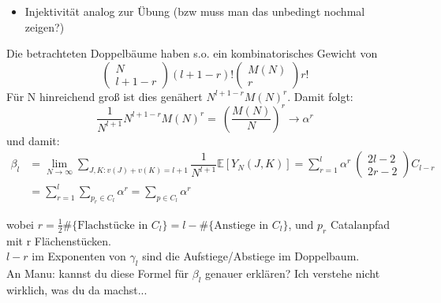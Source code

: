 \documentclass[a4paper, 11pt]{scrreprt}
\newenvironment{beweis}[1][Beweis]{\begin{trivlist}
	\item[\hskip \labelsep {\bfseries #1}]}
	{\end{trivlist}}
\newcommand{\EE}{\mathbb{E}}
\begin{document}
\begin{beweis}
\begin{itemize}
\item[•] Injektivität analog zur Übung (bzw muss man das unbedingt nochmal zeigen?)\\
\end{itemize}
Die betrachteten Doppelbäume haben s.o. ein kombinatorisches Gewicht von 
	\[ \begin{pmatrix} N\\ l+1-r\end{pmatrix} (l+1-r)! \begin{pmatrix} M(N)\\r\end{pmatrix} r! \]
Für N hinreichend groß ist dies genähert \(N^{l+1-r}M(N)^r\). Damit folgt:
	\[\frac {1}{N^{l+1}} N^{l+1-r}M(N)^r =~ \left( \dfrac{M(N)}{N}\right)^{r}\to \alpha^r\]
und damit:
	\begin{align*}
		\beta_l &= \lim_{N \to \infty} \sum_{J,K: v(J)+v(K) = l+1} \dfrac{1}{N^{l+1}}\EE[Y_N(J,K)] = \sum_{r=1}^{l} \alpha^r\ \begin{pmatrix} 2l-2\\2r-2\end{pmatrix} C_{l-r} \\
		&= \sum_{r=1}^{l} \sum_{p_{r} \in C_{l}} \alpha^{r} = \sum_{p\in C_l} \alpha^r
	\end{align*}

wobei \(r = \frac 1 2 \#\{\text{Flachstücke in }C_l\} = l  - \#\{\text{Anstiege in }  C_l\}\), und $ p_{r} $ Catalanpfad mit r Flächenstücken.\\
$ l-r $ im Exponenten von $ \gamma_{l} $ sind die Aufstiege/Abstiege im Doppelbaum.\\
An Manu: kannst du diese Formel für \(\beta_l\) genauer erklären? Ich verstehe nicht wirklich, was du da machst...\\

	


\end{beweis}
\end{document}
